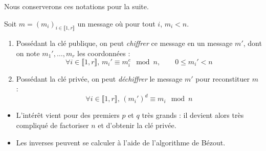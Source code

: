   Nous conserverons ces notations pour la suite.

  \begin{theorem}
    Soit $m = (m_i)_{i \in \llbracket 1, r \rrbracket}$ un message où pour tout $i$, $m_i < n$.
    \begin{enumerate}[label={\bfseries(\roman*)}]
      \item Possédant la clé publique, on peut \textit{chiffrer} ce message en un message $m'$, dont on note $m_1', \dots, m_r$ les coordonnées :
      \[ \forall i \in \llbracket 1,r \rrbracket, \, m_i' \equiv m_i^e \mod n, \qquad 0 \leq m_i' < n \]
      \item Possédant la clé privée, on peut \textit{déchiffrer} le message $m'$ pour reconstituer $m$ :
      \[ \forall i \in \llbracket 1,r \rrbracket, \, (m_i')^d \equiv m_i \mod n \]
    \end{enumerate}
  \end{theorem}

  \begin{remark}
    \begin{itemize}
      \item L'intérêt vient pour des premiers $p$ et $q$ très grands : il devient alors très compliqué de factoriser $n$ et d'obtenir la clé privée.
      \item Les inverses peuvent se calculer à l'aide de l'algorithme de Bézout.
    \end{itemize}
  \end{remark}

